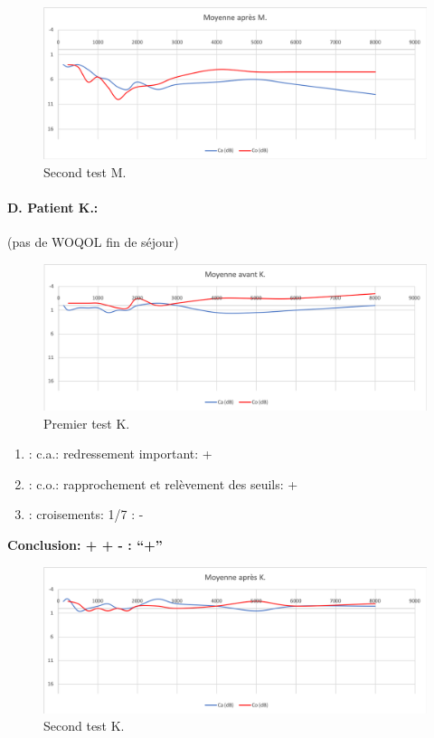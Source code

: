                         \begin{figure}
\centering
\includegraphics[width=0.7\linewidth]{images/graphiques/m_post.png}
\caption[Moyenne OG+OD]{Second test M.}

\end{figure}



\paragraph{D. Patient K.:}

  (pas de WOQOL fin de séjour)

        \begin{figure}
\centering
\includegraphics[width=0.7\linewidth]{images/graphiques/kad_pre.png}
\caption[Moyenne OG+OD]{Premier test K.}

\end{figure}
	\begin{enumerate}

 		\item : c.a.: redressement important: +

 		\item : c.o.: rapprochement et relèvement des seuils: +
 		\item : croisements: 1/7 :  -

                \end{enumerate}

                \textbf{  Conclusion:  + + -       : ``+''}

                 \begin{figure}
\centering
\includegraphics[width=0.7\linewidth]{images/graphiques/kad_post.png}
\caption[Moyenne OG+OD]{Second test K.}

\end{figure}

